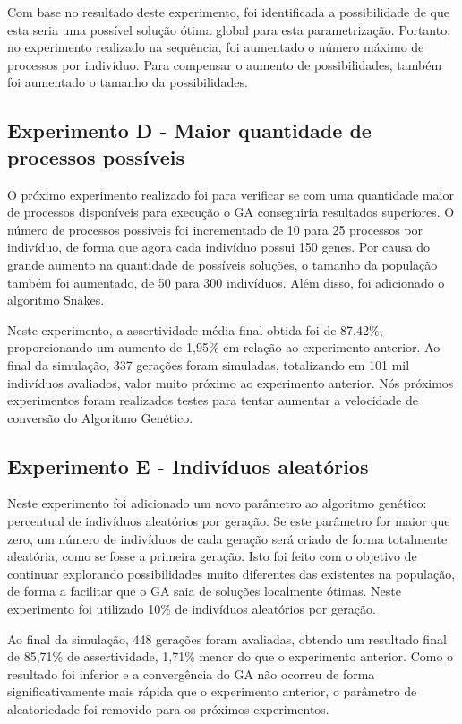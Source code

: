 \documentclass[12pt,oneside,a4paper,english,french,spanish,brazil,]{abntex2}
\begin{document}
Com base no resultado deste experimento, foi identificada a possibilidade de que esta seria uma possível solução ótima global para esta parametrização. Portanto, no experimento realizado na sequência, foi aumentado o número máximo de processos por indivíduo. Para compensar o aumento de possibilidades, também foi aumentado o tamanho da possibilidades.

\subsection{Experimento D - Maior quantidade de processos possíveis}

O próximo experimento realizado foi para verificar se com uma quantidade maior de processos disponíveis para execução o GA conseguiria resultados superiores. O número de processos possíveis foi incrementado de 10 para 25 processos por indivíduo, de forma que agora cada indivíduo possui 150 genes. Por causa do grande aumento na quantidade de possíveis soluções, o tamanho da população também foi aumentado, de 50 para 300 indivíduos. Além disso, foi adicionado o algoritmo Snakes.

Neste experimento, a assertividade média final obtida foi de 87,42\%, proporcionando um aumento de 1,95\% em relação ao experimento anterior. Ao final da simulação, 337 gerações foram simuladas, totalizando em 101 mil indivíduos avaliados, valor muito próximo ao experimento anterior. Nós próximos experimentos foram realizados testes para tentar aumentar a velocidade de conversão do Algoritmo Genético.

\subsection{Experimento E - Indivíduos aleatórios}

Neste experimento foi adicionado um novo parâmetro ao algoritmo genético: percentual de indivíduos aleatórios por geração. Se este parâmetro for maior que zero, um número de indivíduos de cada geração será criado de forma totalmente aleatória, como se fosse a primeira geração. Isto foi feito com o objetivo de continuar explorando possibilidades muito diferentes das existentes na população, de forma a facilitar que o GA saia de soluções localmente ótimas. Neste experimento foi utilizado 10\% de indivíduos aleatórios por geração.

Ao final da simulação, 448 gerações foram avaliadas, obtendo um resultado final de 85,71\% de assertividade, 1,71\% menor do que o experimento anterior. Como o resultado foi inferior e a convergência do GA não ocorreu de forma significativamente mais rápida que o experimento anterior, o parâmetro de aleatoriedade foi removido para os próximos experimentos.
\end{document}
